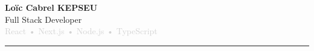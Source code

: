 

\begin{center}
    {\Huge\bfseries\textcolor{navyblue}{Loïc Cabrel KEPSEU}}\\[8pt]

    {\Large\textcolor{mediumgray}{Full Stack Developer}}\\[6pt]

    {\large\textcolor{lightgray}{React • Next.js • Node.js • TypeScript}}\\[10pt]
\end{center}

\begin{center}
    \textcolor{navyblue}{\rule{0.9\linewidth}{0.8pt}}
\end{center}
\vspace{6pt}

